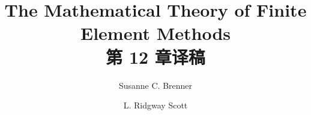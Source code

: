 \documentclass[a4paper,UTF8,12pt]{ctexart}
\title{The Mathematical Theory of Finite Element Methods\\第 12 章译稿}
\author{Susanne C. Brenner \and L. Ridgway Scott}
\date{}
\begin{document}
\maketitle
\setcounter{section}{11}
\renewcommand{\thethmcount}{\thesubsection.\arabic{thmcount}}
\renewcommand{\theequation}{\thesubsection.\arabic{equation}}
\renewcommand{\thefigure}{\thesection.\arabic{figure}}
\renewcommand{\thetable}{\thesection.\arabic{table}}

\end{document}
